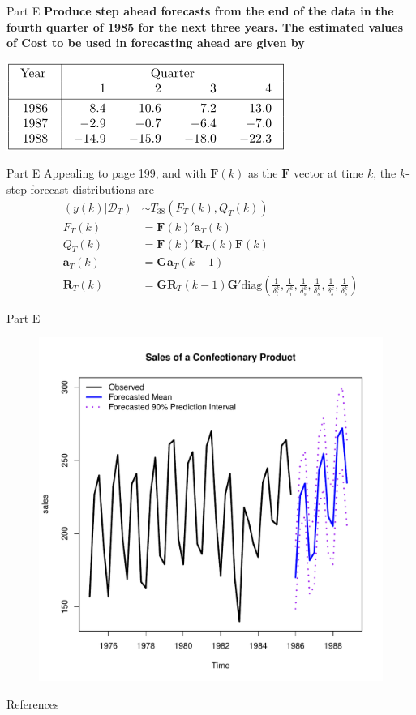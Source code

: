 \documentclass[14pt]{beamer}
\newcommand{\sD}{\mathcal{D}}
\newcommand{\bF}{\mathbf{F}}
\newcommand{\bG}{\mathbf{G}}
\newcommand{\ba}{\mathbf{a}}
\newcommand{\bR}{\mathbf{R}}
\begin{document}
	\begin{frame}{Part E}
		\textbf{Produce step ahead forecasts from the end of the data in the fourth quarter of 1985 for the next three years. The estimated values of Cost to be used in forecasting ahead are given by}
		\begin{center}
			\includegraphics[width=0.5\linewidth]{CostFuture}
		\end{center}
	\end{frame}

	\begin{frame}{Part E}
		Appealing to \cite{harrison1999bayesian} page 199, and with $\bF(k)$ as the $\bF$ vector at time $k$, the $k$-step forecast distributions are
		{\footnotesize \begin{align*}
			(y(k)|\sD_T) & \sim T_{38}(F_T(k),Q_T(k))   \\
			F_T(k) & = \bF(k)'\ba_T(k) \\ Q_T(k) & = \bF(k)'\bR_T(k) \bF(k) \\
			\ba_T(k) & = \bG\ba_T(k-1)  \\ \bR_T(k) & = \bG\bR_T(k-1)\bG' \text{diag}\left( \frac{1}{\delta_t^k},\frac{1}{\delta_r^k},\frac{1}{\delta_s^k},\frac{1}{\delta_s^k},\frac{1}{\delta_s^k},\frac{1}{\delta_s^k} \right) 
		\end{align*}}
	\end{frame}

	\begin{frame}{Part E}
		\begin{figure}
			\centering
			\includegraphics[width=0.7\linewidth]{StepAhead}
		\end{figure}
	\end{frame}

	\begin{frame}{References}
		\nocite{prado2010time}
		
		
	\end{frame}
	
\end{document}
